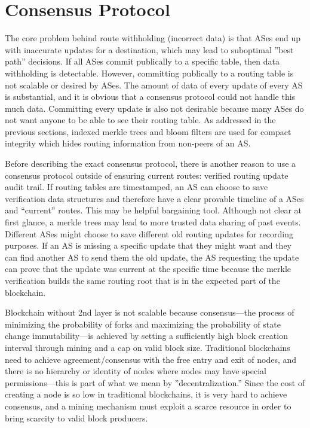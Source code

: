 \documentclass[letterpaper, 10 pt, conference]{ieeeconf}  %
\begin{document}
\section{Consensus Protocol}

The core problem behind route withholding (incorrect data) is that ASes end up with inaccurate updates for a destination, which may lead to suboptimal ”best path” decisions. If all ASes commit publically to a specific table, then data withholding is detectable. However, committing publically to a routing table is not scalable or desired by ASes. The amount of data of every update of every AS is substantial, and it is obvious that a consensus protocol could not handle this much data. Committing every update is also not desirable because many ASes do not want anyone to be able to see their routing table. As addressed in the previous sections, indexed merkle trees and bloom filters are used for compact integrity which hides routing information from non-peers of an AS.

Before describing the exact consensus protocol, there is another reason to use a consensus protocol outside of ensuring current routes: verified routing update audit trail. If routing tables are timestamped, an AS can choose to save verification data structures and therefore have a clear provable timeline of a ASes and “current” routes. This may be helpful bargaining tool. Although not clear at first glance, a merkle trees may lead to more trusted data sharing of past events. Different ASes might choose to save different old routing updates for recording purposes. If an AS is missing a specific update that they might want and they can find another AS to send them the old update, the AS requesting the update can prove that the update was current at the specific time because the merkle verification builds the same routing root that is in the expected part of the blockchain. 

Blockchain without 2nd layer is not scalable because consensus---the process of minimizing the probability of forks and maximizing the probability of state change immutability---is achieved by setting a sufficiently high block creation interval through mining and a cap on valid block size. Traditional blockchains need to achieve agreement/consensus with the free entry and exit of nodes, and there is no hierarchy or identity of nodes where nodes may have special permissions---this is part of what we mean by ”decentralization.” Since the cost of creating a node is so low in traditional blockchains, it is very hard to achieve consensus, and a mining mechanism must exploit a scarce resource in order to bring scarcity to valid block producers. 
\end{document}
